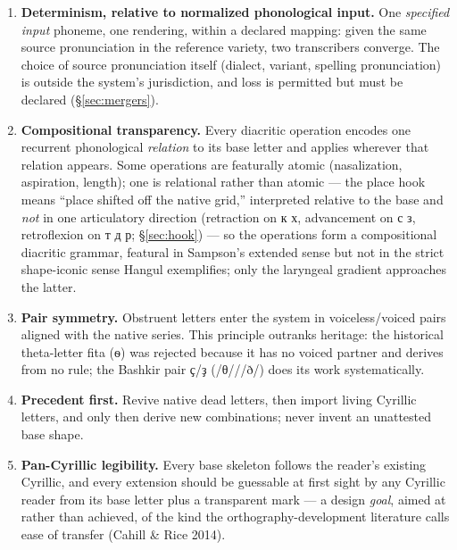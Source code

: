 \documentclass[11pt]{article}
\newcommand{\cz}[1]{{\chu #1}}
\newcommand{\ph}[1]{{\ipafont/#1/}}
\begin{document}
\begin{enumerate}
\item \textbf{Determinism, relative to normalized phonological input.} One \emph{specified input} phoneme, one rendering, within a declared mapping: given the same source pronunciation in the reference variety, two transcribers converge. The choice of source pronunciation itself (dialect, variant, spelling pronunciation) is outside the system's jurisdiction, and loss is permitted but must be declared (\S\ref{sec:mergers}).
\item \textbf{Compositional transparency.} Every diacritic operation encodes one recurrent phonological \emph{relation} to its base letter and applies wherever that relation appears. Some operations are featurally atomic (nasalization, aspiration, length); one is relational rather than atomic — the place hook means ``place shifted off the native grid,'' interpreted relative to the base and \emph{not} in one articulatory direction (retraction on \cz{к х}, advancement on \cz{с з}, retroflexion on \cz{т д р}; \S\ref{sec:hook}) — so the operations form a compositional diacritic grammar, featural in Sampson's extended sense but not in the strict shape-iconic sense Hangul exemplifies; only the laryngeal gradient approaches the latter.
\item \textbf{Pair symmetry.} Obstruent letters enter the system in voiceless/voiced pairs aligned with the native series. This principle outranks heritage: the historical theta-letter fita (\cz{ѳ}) was rejected because it has no voiced partner and derives from no rule; the Bashkir pair \cz{ҫ}/\cz{ҙ} (\ph{θ}/\ph{ð}) does its work systematically.
\item \textbf{Precedent first.} Revive native dead letters, then import living Cyrillic letters, and only then derive new combinations; never invent an unattested base shape.
\item \textbf{Pan-Cyrillic legibility.} Every base skeleton follows the reader's existing Cyrillic, and every extension should be guessable at first sight by any Cyrillic reader from its base letter plus a transparent mark — a design \emph{goal}, aimed at rather than achieved, of the kind the orthography-development literature calls ease of transfer (Cahill \& Rice 2014).


\end{enumerate}
\end{document}
